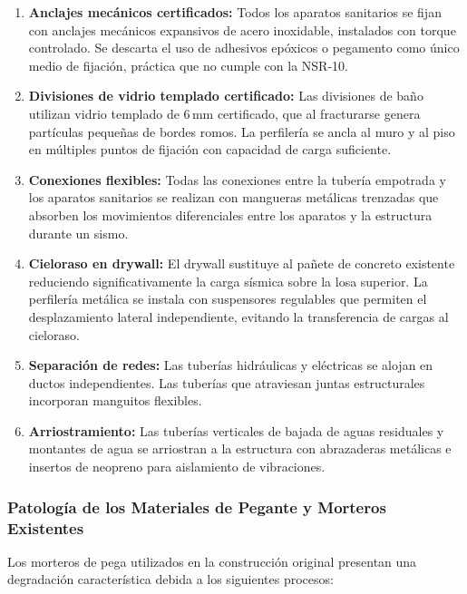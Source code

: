 ﻿\documentclass[12pt]{article}
\begin{document}
\begin{enumerate}[noitemsep]
  \item {\bfseries Anclajes mecánicos certificados:} Todos los aparatos sanitarios se
  fijan con anclajes mecánicos expansivos de acero inoxidable, instalados con torque
  controlado. Se descarta el uso de adhesivos epóxicos o pegamento como único medio de
  fijación, práctica que no cumple con la NSR-10.
  \item {\bfseries Divisiones de vidrio templado certificado:} Las divisiones de baño
  utilizan vidrio templado de 6\,mm certificado, que al fracturarse genera partículas
  pequeñas de bordes romos. La perfilería se ancla al muro y al piso en múltiples
  puntos de fijación con capacidad de carga suficiente.
  \item {\bfseries Conexiones flexibles:} Todas las conexiones entre la tubería empotrada
  y los aparatos sanitarios se realizan con mangueras metálicas trenzadas que absorben
  los movimientos diferenciales entre los aparatos y la estructura durante un sismo.
  \item {\bfseries Cieloraso en drywall:} El drywall sustituye al pañete de concreto
  existente reduciendo significativamente la carga sísmica sobre la losa superior.
  La perfilería metálica se instala con suspensores regulables que permiten el
  desplazamiento lateral independiente, evitando la transferencia de cargas al cieloraso.
  \item {\bfseries Separación de redes:} Las tuberías hidráulicas y eléctricas se alojan
  en ductos independientes. Las tuberías que atraviesan juntas estructurales incorporan
  manguitos flexibles.
  \item {\bfseries Arriostramiento:} Las tuberías verticales de bajada de aguas
  residuales y montantes de agua se arriostran a la estructura con abrazaderas
  metálicas e insertos de neopreno para aislamiento de vibraciones.
\end{enumerate}

\subsubsection{Patología de los Materiales de Pegante y Morteros Existentes}

Los morteros de pega utilizados en la construcción original presentan una degradación
característica debida a los siguientes procesos:
\end{document}
